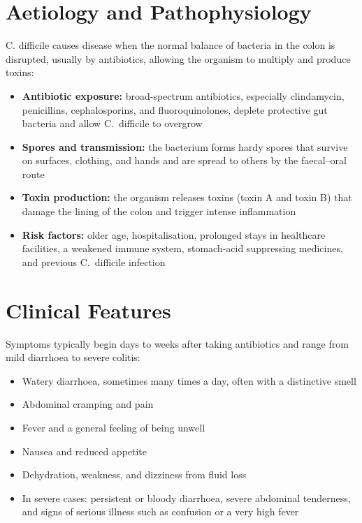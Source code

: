 \section*{Aetiology and Pathophysiology}
C. difficile causes disease when the normal balance of bacteria in the colon is disrupted, usually by antibiotics, allowing the organism to multiply and produce toxins:
\begin{itemize}
    \item \textbf{Antibiotic exposure:} broad-spectrum antibiotics, especially clindamycin, penicillins, cephalosporins, and fluoroquinolones, deplete protective gut bacteria and allow C.\ difficile to overgrow
    \item \textbf{Spores and transmission:} the bacterium forms hardy spores that survive on surfaces, clothing, and hands and are spread to others by the faecal--oral route
    \item \textbf{Toxin production:} the organism releases toxins (toxin A and toxin B) that damage the lining of the colon and trigger intense inflammation
    \item \textbf{Risk factors:} older age, hospitalisation, prolonged stays in healthcare facilities, a weakened immune system, stomach-acid suppressing medicines, and previous C.\ difficile infection
\end{itemize}

\section*{Clinical Features}
Symptoms typically begin days to weeks after taking antibiotics and range from mild diarrhoea to severe colitis:
\begin{itemize}
    \item Watery diarrhoea, sometimes many times a day, often with a distinctive smell
    \item Abdominal cramping and pain
    \item Fever and a general feeling of being unwell
    \item Nausea and reduced appetite
    \item Dehydration, weakness, and dizziness from fluid loss
    \item In severe cases: persistent or bloody diarrhoea, severe abdominal tenderness, and signs of serious illness such as confusion or a very high fever
\end{itemize}

